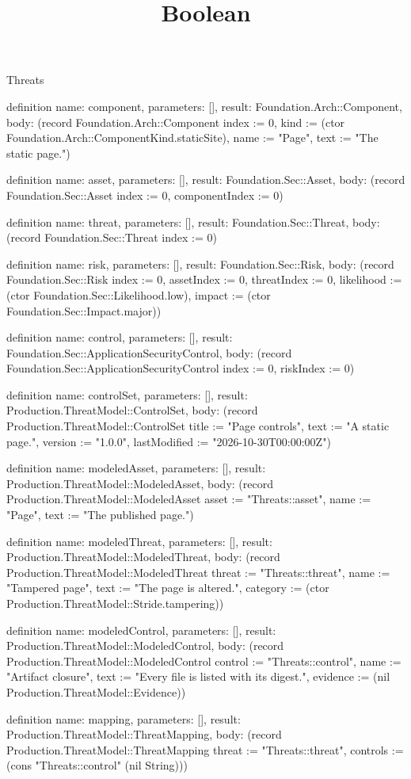 \begin{lexlean}{Threats}
\title{Boolean}
\begin{semanticmodule}
definition{
  name: component,
  parameters: [],
  result: Foundation.Arch::Component,
  body: (record Foundation.Arch::Component {index := 0, kind := (ctor Foundation.Arch::ComponentKind.staticSite), name := "Page", text := "The static page."})
}

definition{
  name: asset,
  parameters: [],
  result: Foundation.Sec::Asset,
  body: (record Foundation.Sec::Asset {index := 0, componentIndex := 0})
}

definition{
  name: threat,
  parameters: [],
  result: Foundation.Sec::Threat,
  body: (record Foundation.Sec::Threat {index := 0})
}

definition{
  name: risk,
  parameters: [],
  result: Foundation.Sec::Risk,
  body: (record Foundation.Sec::Risk {index := 0, assetIndex := 0, threatIndex := 0, likelihood := (ctor Foundation.Sec::Likelihood.low), impact := (ctor Foundation.Sec::Impact.major)})
}

definition{
  name: control,
  parameters: [],
  result: Foundation.Sec::ApplicationSecurityControl,
  body: (record Foundation.Sec::ApplicationSecurityControl {index := 0, riskIndex := 0})
}

definition{
  name: controlSet,
  parameters: [],
  result: Production.ThreatModel::ControlSet,
  body: (record Production.ThreatModel::ControlSet {title := "Page controls", text := "A static page.", version := "1.0.0", lastModified := "2026-10-30T00:00:00Z"})
}

definition{
  name: modeledAsset,
  parameters: [],
  result: Production.ThreatModel::ModeledAsset,
  body: (record Production.ThreatModel::ModeledAsset {asset := "Threats::asset", name := "Page", text := "The published page."})
}

definition{
  name: modeledThreat,
  parameters: [],
  result: Production.ThreatModel::ModeledThreat,
  body: (record Production.ThreatModel::ModeledThreat {threat := "Threats::threat", name := "Tampered page", text := "The page is altered.", category := (ctor Production.ThreatModel::Stride.tampering)})
}

definition{
  name: modeledControl,
  parameters: [],
  result: Production.ThreatModel::ModeledControl,
  body: (record Production.ThreatModel::ModeledControl {control := "Threats::control", name := "Artifact closure", text := "Every file is listed with its digest.", evidence := (nil Production.ThreatModel::Evidence)})
}

definition{
  name: mapping,
  parameters: [],
  result: Production.ThreatModel::ThreatMapping,
  body: (record Production.ThreatModel::ThreatMapping {threat := "Threats::threat", controls := (cons "Threats::control" (nil String))})
}
\end{semanticmodule}
\end{lexlean}
